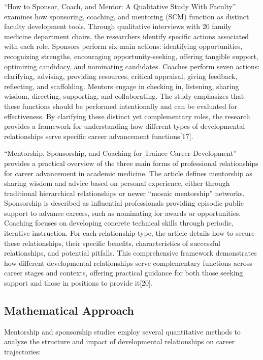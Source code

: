 \documentclass[
  letterpaper,
  DIV=11,
  numbers=noendperiod]{scrartcl}
\begin{document}
``How to Sponsor, Coach, and Mentor: A Qualitative Study With Faculty''
examines how sponsoring, coaching, and mentoring (SCM) function as
distinct faculty development tools. Through qualitative interviews with
20 family medicine department chairs, the researchers identify specific
actions associated with each role. Sponsors perform six main actions:
identifying opportunities, recognizing strengths, encouraging
opportunity-seeking, offering tangible support, optimizing candidacy,
and nominating candidates. Coaches perform seven actions: clarifying,
advising, providing resources, critical appraisal, giving feedback,
reflecting, and scaffolding. Mentors engage in checking in, listening,
sharing wisdom, directing, supporting, and collaborating. The study
emphasizes that these functions should be performed intentionally and
can be evaluated for effectiveness. By clarifying these distinct yet
complementary roles, the research provides a framework for understanding
how different types of developmental relationships serve specific career
advancement functions{[}17{]}.

``Mentorship, Sponsorship, and Coaching for Trainee Career Development''
provides a practical overview of the three main forms of professional
relationships for career advancement in academic medicine. The article
defines mentorship as sharing wisdom and advice based on personal
experience, either through traditional hierarchical relationships or
newer ``mosaic mentorship'' networks. Sponsorship is described as
influential professionals providing episodic public support to advance
careers, such as nominating for awards or opportunities. Coaching
focuses on developing concrete technical skills through periodic,
iterative instruction. For each relationship type, the article details
how to secure these relationships, their specific benefits,
characteristics of successful relationships, and potential pitfalls.
This comprehensive framework demonstrates how different developmental
relationships serve complementary functions across career stages and
contexts, offering practical guidance for both those seeking support and
those in positions to provide it{[}20{]}.

\subsection{Mathematical Approach}\label{mathematical-approach}

Mentorship and sponsorship studies employ several quantitative methods
to analyze the structure and impact of developmental relationships on
career trajectories:
\end{document}
